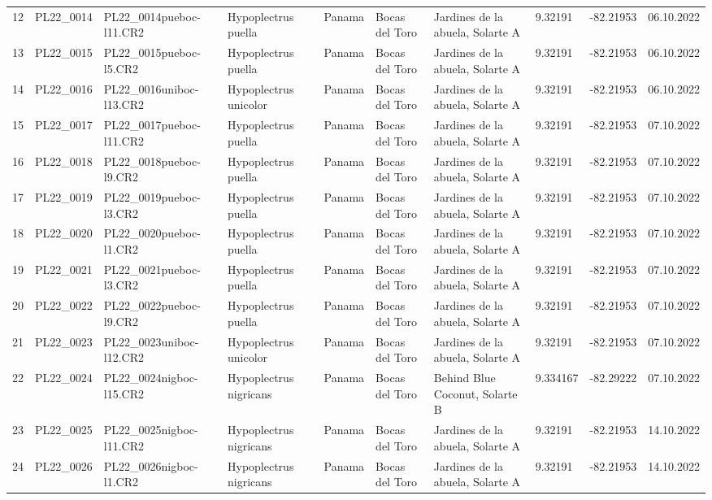 \begin{table}[ht]
\begin{tabular}{rlllllllll}
  12 & PL22\_0014 & PL22\_0014pueboc-l11.CR2 & Hypoplectrus puella & Panama & Bocas del Toro & Jardines de la abuela, Solarte A & 9.32191 & -82.21953 & 06.10.2022 \\ 
  13 & PL22\_0015 & PL22\_0015pueboc-l5.CR2 & Hypoplectrus puella & Panama & Bocas del Toro & Jardines de la abuela, Solarte A & 9.32191 & -82.21953 & 06.10.2022 \\ 
  14 & PL22\_0016 & PL22\_0016uniboc-l13.CR2 & Hypoplectrus unicolor & Panama & Bocas del Toro & Jardines de la abuela, Solarte A & 9.32191 & -82.21953 & 06.10.2022 \\ 
  15 & PL22\_0017 & PL22\_0017pueboc-l11.CR2 & Hypoplectrus puella & Panama & Bocas del Toro & Jardines de la abuela, Solarte A & 9.32191 & -82.21953 & 07.10.2022 \\ 
  16 & PL22\_0018 & PL22\_0018pueboc-l9.CR2 & Hypoplectrus puella & Panama & Bocas del Toro & Jardines de la abuela, Solarte A & 9.32191 & -82.21953 & 07.10.2022 \\ 
  17 & PL22\_0019 & PL22\_0019pueboc-l3.CR2 & Hypoplectrus puella & Panama & Bocas del Toro & Jardines de la abuela, Solarte A & 9.32191 & -82.21953 & 07.10.2022 \\ 
  18 & PL22\_0020 & PL22\_0020pueboc-l1.CR2 & Hypoplectrus puella & Panama & Bocas del Toro & Jardines de la abuela, Solarte A & 9.32191 & -82.21953 & 07.10.2022 \\ 
  19 & PL22\_0021 & PL22\_0021pueboc-l3.CR2 & Hypoplectrus puella & Panama & Bocas del Toro & Jardines de la abuela, Solarte A & 9.32191 & -82.21953 & 07.10.2022 \\ 
  20 & PL22\_0022 & PL22\_0022pueboc-l9.CR2 & Hypoplectrus puella & Panama & Bocas del Toro & Jardines de la abuela, Solarte A & 9.32191 & -82.21953 & 07.10.2022 \\ 
  21 & PL22\_0023 & PL22\_0023uniboc-l12.CR2 & Hypoplectrus unicolor & Panama & Bocas del Toro & Jardines de la abuela, Solarte A & 9.32191 & -82.21953 & 07.10.2022 \\ 
  22 & PL22\_0024 & PL22\_0024nigboc-l15.CR2 & Hypoplectrus nigricans  & Panama & Bocas del Toro & Behind Blue Coconut, Solarte B & 9.334167 & -82.29222 & 07.10.2022 \\ 
  23 & PL22\_0025 & PL22\_0025nigboc-l11.CR2 & Hypoplectrus nigricans  & Panama & Bocas del Toro & Jardines de la abuela, Solarte A & 9.32191 & -82.21953 & 14.10.2022 \\ 
  24 & PL22\_0026 & PL22\_0026nigboc-l1.CR2 & Hypoplectrus nigricans  & Panama & Bocas del Toro & Jardines de la abuela, Solarte A & 9.32191 & -82.21953 & 14.10.2022 \\ 

\end{tabular}
\end{table}
